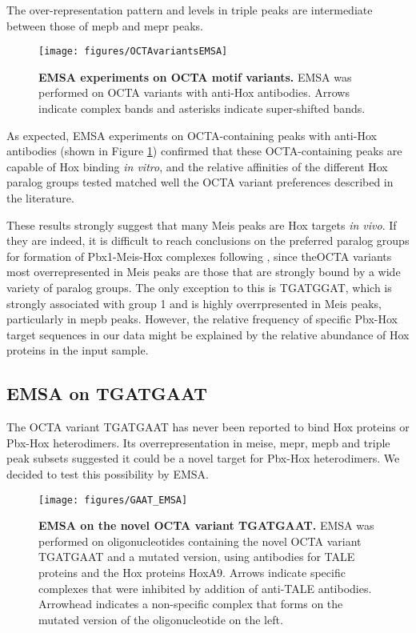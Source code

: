 The over-representation pattern and levels in triple peaks are intermediate between those of \ac{mepb} and \ac{mepr} peaks. 

\begin{figure}[]
  \centering
  \texttt{[image: figures/OCTAvariantsEMSA]}
  \caption[EMSA experiments on OCTA motif variants]{\textbf{EMSA experiments on OCTA motif variants.} EMSA was performed on \ac{OCTA} variants with anti-Hox antibodies. Arrows indicate complex bands and asterisks indicate super-shifted bands.}
  \label{fig:OCTAvariantsEMSA}
\end{figure}

As expected, \ac{EMSA} experiments on \ac{OCTA}-containing peaks with anti-Hox antibodies (shown in Figure \ref{fig:OCTAvariantsEMSA}) confirmed that these \ac{OCTA}-containing peaks are capable of Hox binding \textit{in vitro}, and the relative affinities of the different Hox paralog groups tested matched well the \ac{OCTA} variant preferences described in the literature. 

These results strongly suggest that many Meis peaks are Hox targets \textit{in vivo}. If they are indeed, it is difficult to reach conclusions on the preferred paralog groups for formation of Pbx1-Meis-Hox complexes following \textcite{Slattery2011}, since the\ac{OCTA} variants  most overrepresented in Meis peaks are those that are strongly bound by a wide variety of paralog groups. The only exception to this is TGATGGAT, which is strongly associated with group 1 and is highly overrpresented in Meis peaks, particularly in \ac{mepb} peaks. However, the relative frequency of specific Pbx-Hox target sequences in our data might be explained by the relative abundance of Hox proteins in the input sample. 

\subsection{EMSA on TGATGAAT}

The \ac{OCTA} variant TGATGAAT has never been reported to bind Hox proteins or Pbx-Hox heterodimers. Its overrepresentation in \ac{meise}, \ac{mepr}, \ac{mepb} and triple peak subsets suggested it could be a novel target for Pbx-Hox heterodimers. We decided to test this possibility by \ac{EMSA}.

\begin{figure}[]
  \centering
  \texttt{[image: figures/GAAT\_EMSA]}
  \caption[EMSA on the novel OCTA variant TGATGAAT]{\textbf{EMSA on the novel OCTA variant TGATGAAT.} EMSA was performed on oligonucleotides containing the novel OCTA variant TGATGAAT and a mutated version, using antibodies for TALE proteins and the Hox proteins HoxA9. Arrows indicate specific complexes that were inhibited by addition of anti-\ac{TALE} antibodies. Arrowhead indicates a non-specific complex that forms on the mutated version of the oligonucleotide on the left.}
  \label{fig:GAAT_EMSA}
\end{figure}

